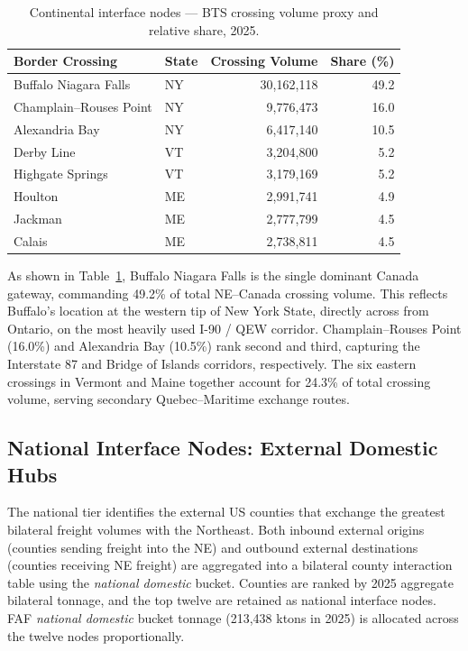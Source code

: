 \begin{table}[htbp]
\centering
\caption{Continental interface nodes — BTS crossing volume proxy and relative share, 2025.}
\begin{tabular}{llrr}
\toprule
Border Crossing & State & Crossing Volume & Share (\%) \\
\midrule
Buffalo Niagara Falls   & NY & 30{,}162{,}118 & 49.2 \\
Champlain--Rouses Point & NY &  9{,}776{,}473 & 16.0 \\
Alexandria Bay          & NY &  6{,}417{,}140 & 10.5 \\
Derby Line              & VT &  3{,}204{,}800 &  5.2 \\
Highgate Springs        & VT &  3{,}179{,}169 &  5.2 \\
Houlton                 & ME &  2{,}991{,}741 &  4.9 \\
Jackman                 & ME &  2{,}777{,}799 &  4.5 \\
Calais                  & ME &  2{,}738{,}811 &  4.5 \\
\bottomrule
\end{tabular}
\label{tab:task2-continental}
\end{table}

As shown in Table~\ref{tab:task2-continental}, Buffalo Niagara Falls is the single
dominant Canada gateway, commanding 49.2\% of total NE--Canada crossing volume.
This reflects Buffalo's location at the western tip of New York State, directly across
from Ontario, on the most heavily used I-90 / QEW corridor. Champlain--Rouses Point
(16.0\%) and Alexandria Bay (10.5\%) rank second and third, capturing the Interstate
87 and Bridge of Islands corridors, respectively. The six eastern crossings in Vermont
and Maine together account for 24.3\% of total crossing volume, serving secondary
Quebec--Maritime exchange routes.

\subsection{National Interface Nodes: External Domestic Hubs}

The national tier identifies the external US counties that exchange the greatest
bilateral freight volumes with the Northeast. Both inbound external origins (counties
sending freight into the NE) and outbound external destinations (counties receiving NE
freight) are aggregated into a bilateral county interaction table using the
\textit{national domestic} bucket. Counties are ranked by 2025 aggregate bilateral
tonnage, and the top twelve are retained as national interface nodes. FAF
\textit{national domestic} bucket tonnage (213{,}438 ktons in 2025) is allocated across
the twelve nodes proportionally.

